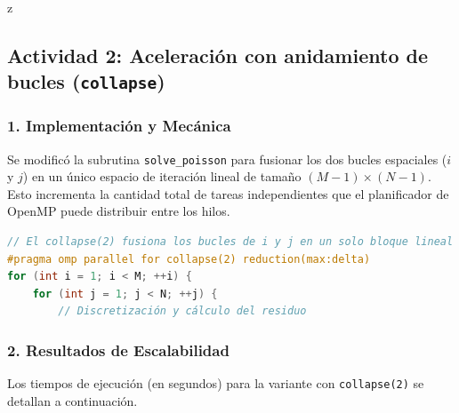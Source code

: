 z\documentclass[11pt,a4paper]{article}
\begin{document}
\subsection*{Actividad 2: Aceleración con anidamiento de bucles (\texttt{collapse})}

\subsubsection*{1. Implementación y Mecánica}
Se modificó la subrutina \texttt{solve\_poisson} para fusionar los dos bucles espaciales ($i$ y $j$) en un único espacio de iteración lineal de tamaño $(M-1) \times (N-1)$. Esto incrementa la cantidad total de tareas independientes que el planificador de OpenMP puede distribuir entre los hilos.

\begin{lstlisting}[language=C++, caption={Implementación de collapse en \texttt{poisson\_collapse.cpp}}, label={lst:act2}]
// El collapse(2) fusiona los bucles de i y j en un solo bloque lineal
#pragma omp parallel for collapse(2) reduction(max:delta)
for (int i = 1; i < M; ++i) {
    for (int j = 1; j < N; ++j) {
        // Discretización y cálculo del residuo
\end{lstlisting}

\subsubsection*{2. Resultados de Escalabilidad}
Los tiempos de ejecución (en segundos) para la variante con \texttt{collapse(2)} se detallan a continuación.
\end{document}

